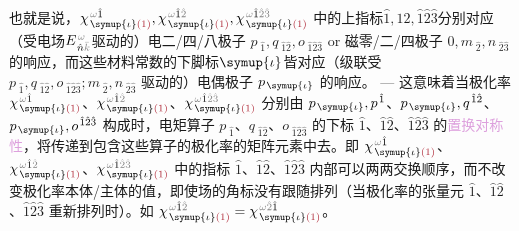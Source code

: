 也就是说，$\chi^{\;\! \mathcolor{gray}{\omega} \hat{1}}_{\;\! \symup{\iota} \textcolor{Maroon}{(1)}},\chi^{\;\! \mathcolor{gray}{\omega} \hat{1} \mathcolor{gray}{\hat{2}}}_{\;\! \symup{\iota} \textcolor{Maroon}{(1)}},\chi^{\;\! \mathcolor{gray}{\omega} \hat{1} \mathcolor{gray}{\hat{2} \hat{3}}}_{\;\! \symup{\iota} \textcolor{Maroon}{(1)}}$ 中的上指标$\hat{1},\hat{1} \hat{2},\hat{1} \hat{2} \hat{3}$分别对应（受电场$E^{\;\!\mathcolor{gray}{\omega}}_{\;\! \hat{n} \mathcolor{gray}{\bar{k}}}$驱动的）\textcolor{NavyBlue}{电二/四/八}极子 $p_{\;\! \hat{1}}, q_{\;\! \hat{1} \hat{2}}, o_{\;\! \hat{1} \hat{2} \hat{3}}$ or \textcolor{NavyBlue}{磁零/二/四}极子 $0, m_{\;\! \hat{2}}, n_{\;\! \hat{2} \hat{3}}$ 的响应，而这些材料常数的下脚标$\symup{\iota}$皆对应（级联受 $p_{\;\! \hat{1}}, q_{\;\! \hat{1} \hat{2}}, o_{\;\! \hat{1} \hat{2} \hat{3}}; m_{\;\! \hat{2}}, n_{\;\! \hat{2} \hat{3}}$ 驱动的）电偶极子 $p_{\;\! \symup{\iota}}$ 的响应。 --- 这意味着当极化率 $\chi^{\;\! \mathcolor{gray}{\omega} \hat{1}}_{\;\! \symup{\iota} \textcolor{Maroon}{(1)}}$、$\chi^{\;\! \mathcolor{gray}{\omega} \hat{1} \mathcolor{gray}{\hat{2}}}_{\;\! \symup{\iota} \textcolor{Maroon}{(1)}}$、$\chi^{\;\! \mathcolor{gray}{\omega} \hat{1} \mathcolor{gray}{\hat{2} \hat{3}}}_{\;\! \symup{\iota} \textcolor{Maroon}{(1)}}$ 分别由 $p_{\;\! \symup{\iota}}, p^{\;\! \hat{1}}$、$p_{\;\! \symup{\iota}}, q^{\;\! \hat{1} \hat{2}}$、$p_{\;\! \symup{\iota}}, o^{\;\! \hat{1} \hat{2} \hat{3}}$ 构成时，电矩算子 $p_{\;\! \hat{1}}$、$ q_{\;\! \hat{1} \hat{2}}$、$ o_{\;\! \hat{1} \hat{2} \hat{3}}$ 的下标 $\hat{1}$、$\hat{1} \hat{2}$、$\hat{1} \hat{2} \hat{3}$ 的\textcolor{Plum}{置换对称性}，将传递到包含这些算子的极化率的矩阵元素中去。即 $\chi^{\;\! \mathcolor{gray}{\omega} \hat{1}}_{\;\! \symup{\iota} \textcolor{Maroon}{(1)}}$、$\chi^{\;\! \mathcolor{gray}{\omega} \hat{1} \mathcolor{gray}{\hat{2}}}_{\;\! \symup{\iota} \textcolor{Maroon}{(1)}}$、$\chi^{\;\! \mathcolor{gray}{\omega} \hat{1} \mathcolor{gray}{\hat{2} \hat{3}}}_{\;\! \symup{\iota} \textcolor{Maroon}{(1)}}$ 中的指标 $\hat{1}$、$\hat{1} \hat{2}$、$\hat{1} \hat{2} \hat{3}$ 内部可以两两交换顺序，而不改变极化率本体/主体的值，即使场的角标没有跟随排列（当极化率的张量元 $\hat{1}$、$\hat{1} \hat{2}$、$\hat{1} \hat{2} \hat{3}$ 重新排列时）。如 $\chi^{\;\! \mathcolor{gray}{\omega} \hat{1} \mathcolor{gray}{\hat{2}}}_{\;\! \symup{\iota} \textcolor{Maroon}{(1)}} = \chi^{\;\! \mathcolor{gray}{\omega} \mathcolor{gray}{\hat{2}} \hat{1}}_{\;\! \symup{\iota} \textcolor{Maroon}{(1)}}$。

